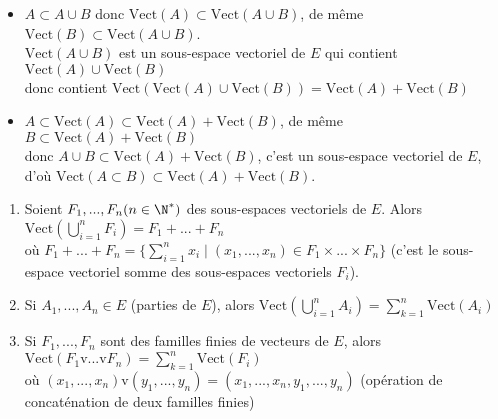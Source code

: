 \documentclass[12pt, a4paper]{report}
\begin{document}
\begin{remarque}{}
\begin{demo}{}
\begin{itemize}
	\item $A \subset A \cup B$ donc $\text{Vect}(A) \subset \text{Vect}(A \cup B)$, de même $\text{Vect}(B) \subset \text{Vect}(A \cup B)$. \\
	$\text{Vect}(A \cup B)$ est un sous-espace vectoriel de $E$ qui contient $\text{Vect}(A) \cup \text{Vect}(B)$ \\
	donc contient $\text{Vect}(\text{Vect}(A) \cup \text{Vect}(B)) = \text{Vect}(A) + \text{Vect}(B)$
	
	\item $A \subset \text{Vect}(A) \subset \text{Vect}(A) + \text{Vect}(B)$, de même $B \subset \text{Vect}(A) + \text{Vect}(B)$ \\
	donc $A \cup B \subset \text{Vect}(A) + \text{Vect}(B)$, c'est un sous-espace vectoriel de $E$, d'où $\text{Vect}(A \subset B) \subset \text{Vect}(A) + \text{Vect}(B)$.
\end{itemize}
\end{demo}
\end{remarque}

\begin{remarque}[Généralisation]
\begin{enumerate}
	\item Soient $F_1,...,F_n (n \in \N^*)$ des sous-espaces vectoriels de $E$. Alors $\text{Vect}\left(\displaystyle{\bigcup_{i=1}^nF_i}\right) = F_1+...+F_n$ \\
	où $F_1+...+F_n = \{\displaystyle{\sum_{i=1}^nx_i} \mid (x_1,...,x_n) \in F_1 \times ... \times F_n \}$
	(c'est le sous-espace vectoriel somme des sous-espaces vectoriels $F_i$).
	
	\item Si $A_1,...,A_n \in E$ (parties de $E$), alors $\text{Vect} \left(\displaystyle{\bigcup_{i=1}^nA_i}\right) = \displaystyle{\sum_{k=1}^n \text{Vect}(A_i)}$
	
	\item Si $F_1,...,F_n$ sont des familles finies de vecteurs de $E$, alors \\
	$\text{Vect}(F_1 \text{v} ... \text{v} F_n) = \displaystyle{\sum_{k=1}^n \text{Vect}(F_i)}$ \\
	où $(x_1,...,x_n) \text{v} (y_1,...,y_n) = (x_1,...,x_n,y_1,...,y_n)$ (opération de concaténation de deux familles finies) 
\end{enumerate}
\end{remarque}
\end{document}
